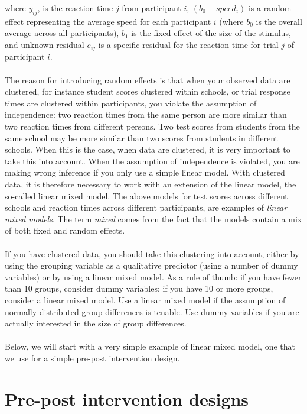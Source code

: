 \documentclass[]{report}\usepackage[]{graphicx}\usepackage[]{color}
\begin{document}
where $y_{ij}$, is the reaction time $j$ from participant $i$, $(b_0 + speed_i)$ is a random effect representing the average speed for each participant $i$ (where $b_0$ is the overall average across all participants), $b_1$ is the fixed effect of the size of the stimulus, and unknown residual $e_{ij}$ is a specific residual for the reaction time for trial $j$ of participant $i$.
\\
\\
The reason for introducing random effects is that when your observed data are clustered, for instance student scores clustered within schools, or trial response times are clustered within participants, you violate the assumption of independence: two reaction times from the same person are more similar than two reaction times from different persons. Two test scores from students from the same school may be more similar than two scores from students in different schools. When this is the case, when data are clustered, it is very important to take this into account. When the assumption of independence is violated, you are making wrong inference if you only use a simple linear model. With clustered data, it is therefore necessary to work with an extension of the linear model, the so-called linear mixed model. The above models for test scores across different schools and reaction times across different participants, are examples of \textit{linear mixed models}. The term \textit{mixed} comes from the fact that the models contain a mix of both fixed and random effects. 
\\
\\
If you have clustered data, you should take this clustering into account, either by using the grouping variable as a qualitative predictor (using a number of dummy variables) or by using a linear mixed model. As a rule of thumb: if you have fewer than 10 groups, consider dummy variables; if you have 10 or more groups, consider a linear mixed model. Use a linear mixed model if the assumption of normally distributed group differences is tenable. Use dummy variables if you are actually interested in the size of group differences.
\\
\\
Below, we will start with a very simple example of linear mixed model, one that we use for a simple pre-post intervention design.



\section{Pre-post intervention designs}
\end{document}
